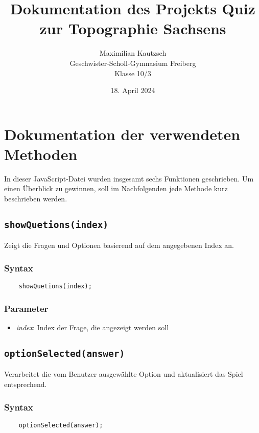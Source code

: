 \documentclass[10pt, fleqn]{scrartcl}
\title{Dokumentation des Projekts \glqq{}Quiz zur Topographie Sachsens\grqq{}}
\date{18. April 2024}
\author{Maximilian Kautzsch
	\\ Geschwister-Scholl-Gymnasium Freiberg 
	\\ Klasse 10/3}
\begin{document}
\maketitle


\section{Dokumentation der verwendeten Methoden}

In dieser JavaScript-Datei wurden insgesamt sechs Funktionen geschrieben. Um einen Überblick zu gewinnen, soll im Nachfolgenden jede Methode kurz beschrieben werden.

\subsection{\texttt{showQuetions(index)}}
Zeigt die Fragen und Optionen basierend auf dem angegebenen Index an.

\subsubsection*{Syntax}
\begin{lstlisting}
	showQuetions(index);
\end{lstlisting}

\subsubsection*{Parameter}
\begin{itemize}
	\item \textit{index}: Index der Frage, die angezeigt werden soll
\end{itemize}

\subsection{\texttt{optionSelected(answer)}}
Verarbeitet die vom Benutzer ausgewählte Option und aktualisiert das Spiel entsprechend.

\subsubsection*{Syntax}
\begin{lstlisting}
	optionSelected(answer);
\end{lstlisting}
\end{document}
